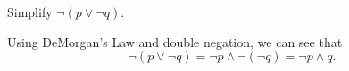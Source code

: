 \begin{exa} 
Simplify  $\neg(p\vee \neg q)$.
\begin{sol}
 Using DeMorgan's Law and double negation, we can see that 
 $$\neg (p\vee \neg q) = \neg p \wedge \neg (\neg q) = \neg p \wedge q.$$
\end{sol}
\end{exa}
%
%
%
%
